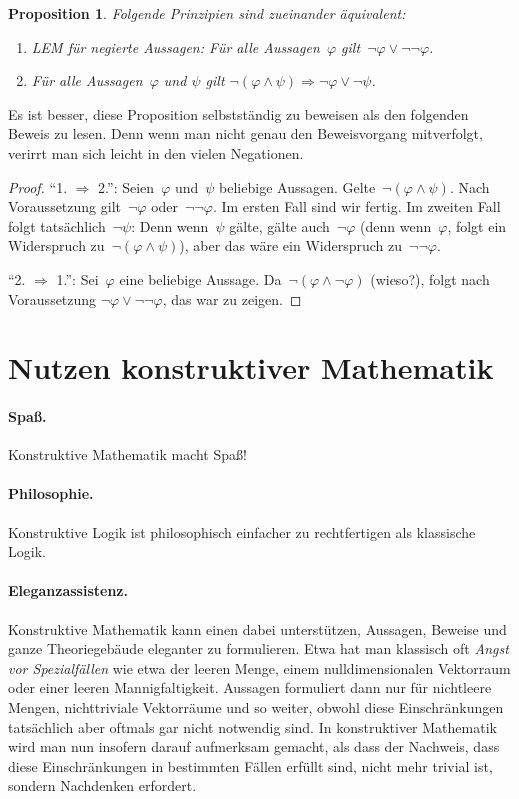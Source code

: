 \documentclass[a4paper,ngerman,12pt]{scrartcl}
\theoremstyle{definition}
\theoremstyle{plain}
\newtheorem{prop}[defn]{Proposition}
\theoremstyle{remark}
\renewcommand{\_}{\mathpunct{.}\,}
\newcommand{\?}{\,{:}\,}
\begin{document}
\begin{prop}Folgende Prinzipien sind zueinander äquivalent:
\begin{enumerate}
\item[1.] LEM für negierte Aussagen: Für alle Aussagen~$\varphi$
gilt~$\neg\varphi \vee \neg\neg\varphi$.
\item[2.] Für alle Aussagen~$\varphi$ und $\psi$ gilt $\neg(\varphi \wedge \psi)
\Longrightarrow \neg\varphi \vee \neg\psi$.
\end{enumerate}
\end{prop}
Es ist besser, diese Proposition selbstständig zu beweisen als den folgenden
Beweis zu lesen. Denn wenn man nicht genau den Beweisvorgang mitverfolgt,
verirrt man sich leicht in den vielen Negationen.
\begin{proof}"`1. $\Rightarrow$ 2."': Seien~$\varphi$ und~$\psi$ beliebige
Aussagen. Gelte~$\neg(\varphi \wedge \psi)$. Nach
Voraussetzung gilt~$\neg\varphi$ oder~$\neg\neg\varphi$. Im ersten Fall sind
wir fertig. Im zweiten Fall folgt tatsächlich~$\neg\psi$: Denn
wenn~$\psi$ gälte, gälte auch~$\neg\varphi$ (denn wenn~$\varphi$, folgt ein
Widerspruch zu~$\neg(\varphi \wedge \psi)$), aber das wäre ein Widerspruch
zu~$\neg\neg\varphi$.

"`2. $\Rightarrow$ 1."': Sei~$\varphi$ eine beliebige Aussage. Da~$\neg(\varphi
\wedge \neg\varphi)$ (wieso?), folgt nach Voraussetzung $\neg\varphi \vee
\neg\neg\varphi$, das war zu zeigen.
\end{proof}


\section{Nutzen konstruktiver Mathematik}

\paragraph{Spaß.} Konstruktive Mathematik macht Spaß!

\paragraph{Philosophie.}
Konstruktive Logik ist philosophisch einfacher zu rechtfertigen als
klassische Logik.

\paragraph{Eleganzassistenz.}
Konstruktive Mathematik kann einen dabei unterstützen, Aussagen, Beweise und
ganze Theoriegebäude eleganter zu formulieren. Etwa hat man klassisch oft
\emph{Angst vor Spezialfällen} wie etwa der leeren Menge, einem
nulldimensionalen Vektorraum oder einer leeren Mannigfaltigkeit. Aussagen
formuliert dann nur für nichtleere Mengen, nichttriviale Vektorräume und so
weiter, obwohl diese Einschränkungen tatsächlich aber oftmals gar nicht
notwendig sind. In konstruktiver Mathematik wird man nun insofern darauf
aufmerksam gemacht, als dass der Nachweis, dass diese Einschränkungen in
bestimmten Fällen erfüllt sind, nicht mehr trivial ist, sondern Nachdenken
erfordert.
\end{document}

